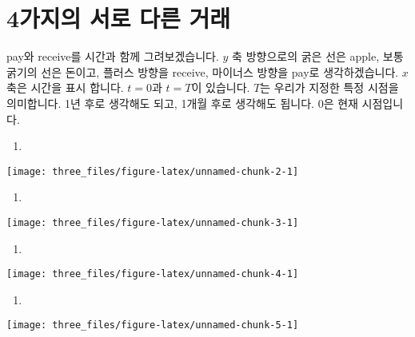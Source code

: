 \documentclass[
]{book}
\providecommand{\tightlist}{%
  \setlength{\itemsep}{0pt}\setlength{\parskip}{0pt}}
\theoremstyle{definition}
\theoremstyle{definition}
\theoremstyle{definition}
\theoremstyle{remark}
\begin{document}
\hypertarget{uxac00uxc9c0uxc758-uxc11cuxb85c-uxb2e4uxb978-uxac70uxb798}{%
\section{4가지의 서로 다른 거래}\label{uxac00uxc9c0uxc758-uxc11cuxb85c-uxb2e4uxb978-uxac70uxb798}}

pay와 receive를 시간과 함께 그려보겠습니다. \(y\) 축 방향으로의 굵은 선은 apple, 보통 굵기의 선은 돈이고, 플러스 방향을 receive, 마이너스 방향을 pay로 생각하겠습니다. \(x\)축은 시간을 표시 합니다. \(t=0\)과 \(t=T\)이 있습니다. \(T\)는 우리가 지정한 특정 시점을 의미합니다. 1년 후로 생각해도 되고, 1개월 후로 생각해도 됩니다. \(0\)은 현재 시점입니다.

\begin{enumerate}
\def\labelenumi{(\alph{enumi})}
\tightlist
\item
\end{enumerate}

\begin{center}\texttt{[image: three\_files/figure-latex/unnamed-chunk-2-1]} \end{center}

\begin{enumerate}
\def\labelenumi{(\alph{enumi})}
\setcounter{enumi}{1}
\tightlist
\item
\end{enumerate}

\begin{center}\texttt{[image: three\_files/figure-latex/unnamed-chunk-3-1]} \end{center}

\begin{enumerate}
\def\labelenumi{(\alph{enumi})}
\setcounter{enumi}{2}
\tightlist
\item
\end{enumerate}

\begin{center}\texttt{[image: three\_files/figure-latex/unnamed-chunk-4-1]} \end{center}

\begin{enumerate}
\def\labelenumi{(\alph{enumi})}
\setcounter{enumi}{3}
\tightlist
\item
\end{enumerate}

\begin{center}\texttt{[image: three\_files/figure-latex/unnamed-chunk-5-1]} \end{center}
\end{document}
